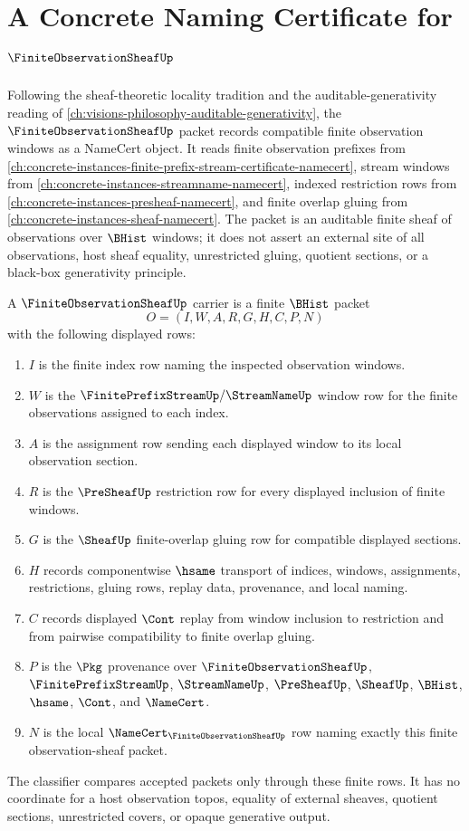 \chapter{A Concrete Naming Certificate for $\FiniteObservationSheafUp$}
\label{ch:concrete-instances-finite-observation-sheaf-namecert}

Following the sheaf-theoretic locality tradition and the auditable-generativity reading of \autoref{ch:visions-philosophy-auditable-generativity}, the $\FiniteObservationSheafUp$ packet records compatible finite observation windows as a NameCert object. It reads finite observation prefixes from \autoref{ch:concrete-instances-finite-prefix-stream-certificate-namecert}, stream windows from \autoref{ch:concrete-instances-streamname-namecert}, indexed restriction rows from \autoref{ch:concrete-instances-presheaf-namecert}, and finite overlap gluing from \autoref{ch:concrete-instances-sheaf-namecert}. The packet is an auditable finite sheaf of observations over $\BHist$ windows; it does not assert an external site of all observations, host sheaf equality, unrestricted gluing, quotient sections, or a black-box generativity principle.

\begin{definition}
\label{def:finite-observation-sheaf-carrier}
A $\FiniteObservationSheafUp$ carrier is a finite $\BHist$ packet
$$
O=(I,W,A,R,G,H,C,P,N)
$$
with the following displayed rows:
\begin{enumerate}
\item $I$ is the finite index row naming the inspected observation windows.
\item $W$ is the $\FinitePrefixStreamUp/\StreamNameUp$ window row for the finite observations assigned to each index.
\item $A$ is the assignment row sending each displayed window to its local observation section.
\item $R$ is the $\PreSheafUp$ restriction row for every displayed inclusion of finite windows.
\item $G$ is the $\SheafUp$ finite-overlap gluing row for compatible displayed sections.
\item $H$ records componentwise $\hsame$ transport of indices, windows, assignments, restrictions, gluing rows, replay data, provenance, and local naming.
\item $C$ records displayed $\Cont$ replay from window inclusion to restriction and from pairwise compatibility to finite overlap gluing.
\item $P$ is the $\Pkg$ provenance over $\FiniteObservationSheafUp$, $\FinitePrefixStreamUp$, $\StreamNameUp$, $\PreSheafUp$, $\SheafUp$, $\BHist$, $\hsame$, $\Cont$, and $\NameCert$.
\item $N$ is the local $\NameCert_{\FiniteObservationSheafUp}$ row naming exactly this finite observation-sheaf packet.
\end{enumerate}
The classifier compares accepted packets only through these finite rows. It has no coordinate for a host observation topos, equality of external sheaves, quotient sections, unrestricted covers, or opaque generative output.
\end{definition}

